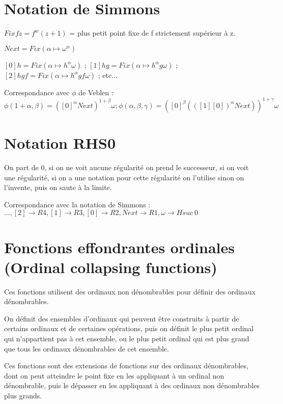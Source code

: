 \documentclass[8pt]{article}
\begin{document}
\section{Notation de Simmons}
\vspace{-0.4cm}
\( Fix f z = f^w(z+1)\) = plus petit point fixe de f strictement supérieur à z.

\( Next = Fix (\alpha \mapsto \omega^\alpha) \)

\( [0] h = Fix (\alpha \mapsto h^\alpha \omega) \) ;
\( [1] h g = Fix (\alpha \mapsto h^\alpha g \omega) \) ;
\( [2] h g f = Fix (\alpha \mapsto h^\alpha g f \omega) \) ; etc...

Correspondance avec \(\phi\) de Veblen : \( \phi(1+\alpha,\beta) = ([0]^\alpha Next)^{1+\beta} \omega ; 
 \phi(\alpha,\beta,\gamma) = ([0]^\beta (([1] [0])^\alpha Next))^{1+\gamma} \omega \)

\vspace{-0.6cm}

\section{Notation RHS0}
\vspace{-0.4cm}
On part de 0, si on ne voit aucune régularité on prend le successeur, si on voit une régularité, si on a une notation pour cette régularité on l'utilise sinon on l'invente, puis on saute à la limite.

Correspondance avec la notation de Simmons : 
\( \ldots, [2] \rightarrow R4, [1] \rightarrow R3, [0] \rightarrow R2, Next \rightarrow R1, \omega \rightarrow H suc\ 0 \)

\vspace{-0.6cm}

\section{Fonctions effondrantes ordinales (Ordinal collapsing functions)}
\vspace{-0.4cm}
Ces fonctions utilisent des ordinaux non dénombrables pour définir des ordinaux dénombrables. 

On définit des ensembles d'ordinaux qui peuvent être construits à partir de certains ordinaux et de certaines opérations, puis on définit le plus petit ordinal qui n'appartient pas à cet ensemble, ou le plus petit ordinal qui est plus grand que tous les ordinaux dénombrables de cet ensemble.

Ces fonctions sont des extensions de fonctions sur des ordinaux dénombrables, dont on peut atteindre le point fixe en les appliquant à un ordinal non dénombrable, puis le dépasser en les appliquant à des ordinaux non dénombrables plus grands.
\end{document}
